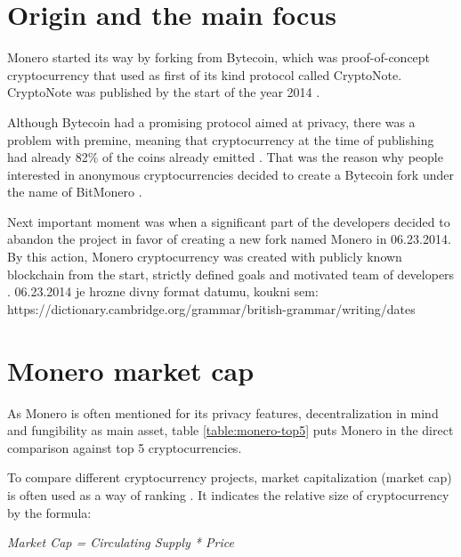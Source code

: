\documentclass[
  printed, %
  table,   %
  nolof,     %
  nolot,     %
           oneside, color
]{fithesis3}
\begin{document}
\section{Origin and the main focus}
Monero started its way by forking from Bytecoin, which was proof-of-concept cryptocurrency that used as first of its kind protocol called CryptoNote. CryptoNote was published by the start of the year 2014 \cite{githubbytecoin}.

Although Bytecoin had a promising protocol aimed at privacy, there was a problem with premine, meaning that cryptocurrency at the time of publishing had already 82\% of the coins already emitted \cite{fluffyponyonbytecoin}. That was the reason why people interested in anonymous cryptocurrencies decided to create a Bytecoin fork under the name of BitMonero \cite{bitmonero}. 

Next important moment was when a significant part of the developers decided to abandon the project in favor of creating a new fork named Monero in 06.23.2014. By this action, Monero cryptocurrency was created with publicly known blockchain from the start, strictly defined goals and motivated team of developers \cite{monerofork}.
06.23.2014 je hrozne divny format datumu, koukni sem:
https://dictionary.cambridge.org/grammar/british-grammar/writing/dates



\section{Monero market cap}
 As Monero is often mentioned for its privacy features, decentralization in mind and fungibility as main asset, table \ref{table:monero-top5} puts Monero in the direct comparison against top 5 cryptocurrencies.

To compare different cryptocurrency projects, market capitalization (market cap) is often used as a way of ranking \cite{elbahrawy2017evolutionary}. It indicates the relative size of cryptocurrency by the formula: \\ \centerline{
 \textit{\textit{Market Cap = Circulating Supply * Price} }}
 
\end{document}
